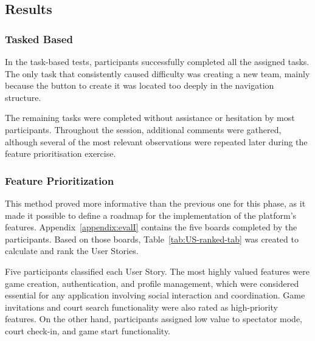 \subsection{Results}
\label{subsec:rp-eval1-results}

\subsubsection{Tasked Based}


In the task-based tests, participants successfully completed all the assigned tasks.
The only task that consistently caused difficulty was creating a new team, mainly because the button to create it was located too deeply in the navigation structure.

The remaining tasks were completed without assistance or hesitation by most participants.
Throughout the session, additional comments were gathered, although several of the most relevant observations were repeated later during the feature prioritisation exercise.

\subsubsection{Feature Prioritization}

This method proved more informative than the previous one for this phase, as it made it possible to define a roadmap for the implementation of the platform’s features.
Appendix~\ref{appendix:evalI} contains the five boards completed by the participants. 
Based on those boards, Table~\ref{tab:US-ranked-tab} was created to calculate and rank the User Stories.

Five participants classified each User Story. 
The most highly valued features were game creation, authentication, and profile management, which were considered essential for any application involving social interaction and coordination.
Game invitations and court search functionality were also rated as high-priority features. 
On the other hand, participants assigned low value to spectator mode, court check-in, and game start functionality.

